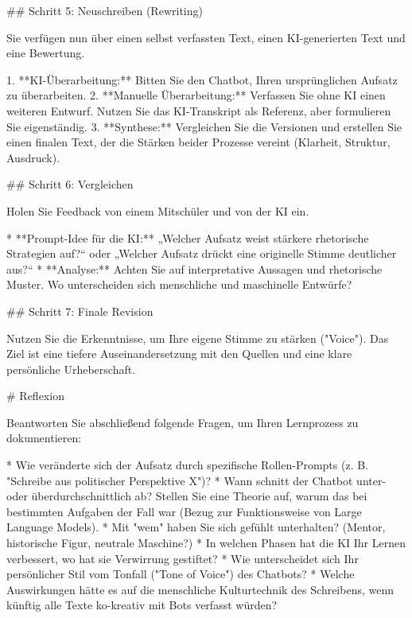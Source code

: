 \documentclass[
  ngerman,
  letterpaper,
  DIV=11]{scrreprt}
\newenvironment{Shaded}{\begin{snugshade}}{\end{snugshade}}
\newcommand{\FunctionTok}[1]{\textcolor[rgb]{0.28,0.35,0.67}{#1}}
\newcommand{\NormalTok}[1]{\textcolor[rgb]{0.00,0.23,0.31}{#1}}
\newcommand{\SpecialStringTok}[1]{\textcolor[rgb]{0.13,0.47,0.30}{#1}}
\begin{document}
\begin{tcolorbox}
\begin{Shaded}
\begin{Highlighting}[]
\FunctionTok{\#\# Schritt 5: Neuschreiben (Rewriting)}

\NormalTok{Sie verfügen nun über einen selbst verfassten Text, einen KI{-}generierten Text und eine Bewertung.}

\SpecialStringTok{1.  }\NormalTok{**KI{-}Überarbeitung:** Bitten Sie den Chatbot, Ihren ursprünglichen Aufsatz zu überarbeiten.}
\SpecialStringTok{2.  }\NormalTok{**Manuelle Überarbeitung:** Verfassen Sie ohne KI einen weiteren Entwurf. Nutzen Sie das KI{-}Transkript als Referenz, aber formulieren Sie eigenständig.}
\SpecialStringTok{3.  }\NormalTok{**Synthese:** Vergleichen Sie die Versionen und erstellen Sie einen finalen Text, der die Stärken beider Prozesse vereint (Klarheit, Struktur, Ausdruck).}

\FunctionTok{\#\# Schritt 6: Vergleichen}

\NormalTok{Holen Sie Feedback von einem Mitschüler und von der KI ein.}

\SpecialStringTok{* }\NormalTok{**Prompt{-}Idee für die KI:** „Welcher Aufsatz weist stärkere rhetorische Strategien auf?“ oder „Welcher Aufsatz drückt eine originelle Stimme deutlicher aus?“}
\SpecialStringTok{* }\NormalTok{**Analyse:** Achten Sie auf interpretative Aussagen und rhetorische Muster. Wo unterscheiden sich menschliche und maschinelle Entwürfe?}

\FunctionTok{\#\# Schritt 7: Finale Revision}

\NormalTok{Nutzen Sie die Erkenntnisse, um Ihre eigene Stimme zu stärken ("Voice"). Das Ziel ist eine tiefere Auseinandersetzung mit den Quellen und eine klare persönliche Urheberschaft.}

\FunctionTok{\# Reflexion}

\NormalTok{Beantworten Sie abschließend folgende Fragen, um Ihren Lernprozess zu dokumentieren:}

\SpecialStringTok{* }\NormalTok{Wie veränderte sich der Aufsatz durch spezifische Rollen{-}Prompts (z. B. "Schreibe aus politischer Perspektive X")?}
\SpecialStringTok{* }\NormalTok{Wann schnitt der Chatbot unter{-} oder überdurchschnittlich ab? Stellen Sie eine Theorie auf, warum das bei bestimmten Aufgaben der Fall war (Bezug zur Funktionsweise von Large Language Models).}
\SpecialStringTok{* }\NormalTok{Mit "wem" haben Sie sich gefühlt unterhalten? (Mentor, historische Figur, neutrale Maschine?)}
\SpecialStringTok{* }\NormalTok{In welchen Phasen hat die KI Ihr Lernen verbessert, wo hat sie Verwirrung gestiftet?}
\SpecialStringTok{* }\NormalTok{Wie unterscheidet sich Ihr persönlicher Stil vom Tonfall ("Tone of Voice") des Chatbots?}
\SpecialStringTok{* }\NormalTok{Welche Auswirkungen hätte es auf die menschliche Kulturtechnik des Schreibens, wenn künftig alle Texte ko{-}kreativ mit Bots verfasst würden?}
\end{Highlighting}
\end{Shaded}

\end{tcolorbox}
\end{document}
